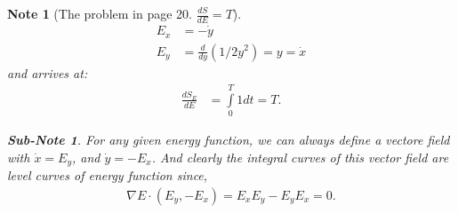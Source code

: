 \documentclass[pdf]{article}
\newtheorem{note}[theorem]{Note}
\newtheorem{subnote}[corollary]{Sub-Note}
\begin{document}
\begin{note}[The problem in page 20. $\frac{dS}{dE} = T$]
\begin{align}
E_x &= -\dot{y}\\
E_y &= \frac{d}{dy}(1/2y^2) = y = \dot{x}
\end{align}
and arrives at:
\begin{align*}
\frac{dS_E}{dE} &= \int\limits_0^T 1 dt = T.
\end{align*}
\begin{subnote}
For any given energy function, we can always define a vectore field with $\dot{x} = E_y$, and $\dot{y} = -E_x$. And clearly the integral curves of this vector field are level curves of energy function since,
\begin{align*}
\nabla E\cdot (E_y, -E_x) = E_xE_y - E_yE_x = 0.
\end{align*}
\end{subnote}
\end{note}
\end{document}
